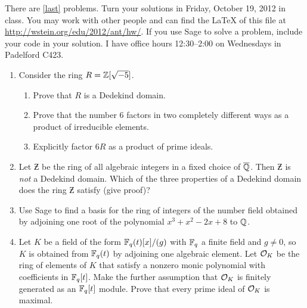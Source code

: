 \documentclass{article}
\title{\dred{Math 581e, Fall 2012, Homework 3}}
\author{William Stein ({\tt wstein@uw.edu})}
\date{Due: Friday, October 19, 2012}
\begin{document}
\maketitle

{\color{dbluecolor}There are \ref{last} problems. Turn your solutions
  in Friday, October 19, 2012 in class.  You may work with other
  people and can find the \LaTeX{} of this file at
  \url{http://wstein.org/edu/2012/ant/hw/}.  If you use Sage to solve
  a problem, include your code in your solution. I have office hours
  12:30--2:00 on Wednesdays in Padelford C423.  }

\begin{enumerate}


\item Consider the ring $R=\mathbb{Z}[\sqrt{-5}]$.
\begin{enumerate}
\item Prove that $R$ is a Dedekind domain.
\item Prove that the number $6$ factors
  in two completely different ways as a product of irreducible
  elements.  
\item Explicitly factor $6R$ as a product of prime ideals. 
\end{enumerate}

\item Let $\Zbar$ be the ring of all algebraic integers in
  a fixed choice of $\overline{\mathbb{Q}}$.  Then $\Zbar$ is {\em not} a Dedekind
  domain.  Which of the three properties of a Dedekind domain does the
  ring $\Zbar$ satisfy (give proof)?  

\item Use Sage to find a basis for the ring of integers of the number
  field obtained by adjoining one root of the polynomial $x^3 + x^2 -
  2x + 8$ to $\mathbb{Q}$.

\item\label{last} Let $K$ be a field of the form $\mathbb{F}_q(t)[x]/(g)$ with
  $\mathbb{F}_q$ a finite field and $g\neq 0$, so $K$ is obtained from
  $\mathbb{F}_q(t)$ by adjoining one algebraic element.  Let $\mathcal{O}_K$ be the
  ring of elements of $K$ that satisfy a nonzero monic polynomial with
  coefficients in $\mathbb{F}_q[t]$.  Make the further assumption that $\mathcal{O}_K$
  is finitely generated as an $\mathbb{F}_q[t]$ module.  Prove that every
  prime ideal of $\mathcal{O}_K$ is maximal.

\end{enumerate}
\end{document}

